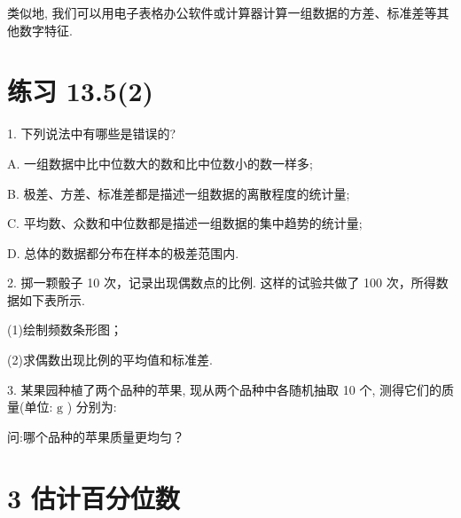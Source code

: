 \documentclass[10pt]{article}
\begin{document}
类似地, 我们可以用电子表格办公软件或计算器计算一组数据的方差、标准差等其他数字特征.

\section*{练习 13.5(2)}

1. 下列说法中有哪些是错误的?

A. 一组数据中比中位数大的数和比中位数小的数一样多;

B. 极差、方差、标准差都是描述一组数据的离散程度的统计量;

C. 平均数、众数和中位数都是描述一组数据的集中趋势的统计量;

D. 总体的数据都分布在样本的极差范围内.

2. 掷一颗骰子 10 次，记录出现偶数点的比例. 这样的试验共做了 100 次，所得数据如下表所示.

\begin{center}
\end{center}

(1)绘制频数条形图；

(2)求偶数出现比例的平均值和标准差.

3. 某果园种植了两个品种的苹果, 现从两个品种中各随机抽取 10 个, 测得它们的质量(单位: \(\mathrm{g}\) ) 分别为:

\begin{center}
\end{center}

问:哪个品种的苹果质量更均匀？

\section*{3 估计百分位数}
\end{document}

